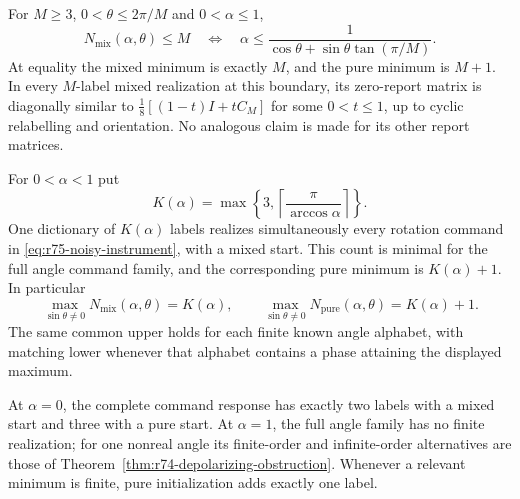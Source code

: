 \begin{theorem}
\label{thm:r75-noisy-memory}
For $M\ge3$, $0<\theta\le2\pi/M$ and $0<\alpha\le1$,
\begin{equation}\label{eq:r75-first-sector}
 N_{\mathrm{mix}}(\alpha,\theta)\le M
 \quad\Longleftrightarrow\quad
 \alpha\le\frac1{\cos\theta+\sin\theta\tan(\pi/M)}.
\end{equation}
At equality the mixed minimum is exactly $M$, and the pure minimum is
$M+1$.  In every $M$-label mixed realization at this boundary, its
zero-report matrix is diagonally similar to
$\frac18[(1-t)I+tC_M]$ for some $0<t\le1$, up to cyclic relabelling and
orientation.  No analogous claim is made for its other report matrices.

For $0<\alpha<1$ put
\begin{equation}\label{eq:r75-universal-count}
 K(\alpha)=\max\left\{3,
               \left\lceil\frac\pi{\arccos\alpha}\right\rceil\right\}.
\end{equation}
One dictionary of $K(\alpha)$ labels realizes simultaneously every
rotation command in \eqref{eq:r75-noisy-instrument}, with a mixed start.
This count is minimal for the full angle command family, and the
corresponding pure minimum is $K(\alpha)+1$.  In particular
\[
 \max_{\sin\theta\ne0}N_{\mathrm{mix}}(\alpha,\theta)=K(\alpha),
 \qquad
 \max_{\sin\theta\ne0}N_{\mathrm{pure}}(\alpha,\theta)=K(\alpha)+1.
\]
The same common upper holds for each finite known angle alphabet, with
matching lower whenever that alphabet contains a phase attaining the
displayed maximum.

At $\alpha=0$, the complete command response has exactly two labels with
a mixed start and three with a pure start.  At $\alpha=1$, the full angle
family has no finite realization; for one nonreal angle its finite-order
and infinite-order alternatives are those of
Theorem~\ref{thm:r74-depolarizing-obstruction}.  Whenever a relevant
minimum is finite, pure initialization adds exactly one label.
\end{theorem}
